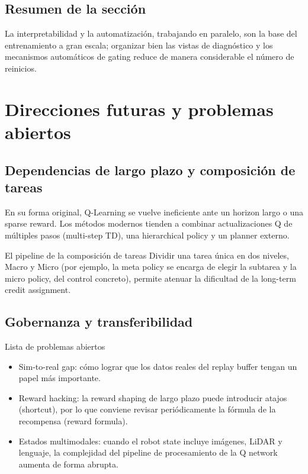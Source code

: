 \documentclass[a4paper]{article}
\begin{document}
\subsection{Resumen de la sección}

La interpretabilidad y la automatización, trabajando en paralelo, son la base del entrenamiento a gran escala; organizar bien las vistas de diagnóstico y los mecanismos automáticos de gating reduce de manera considerable el número de reinicios.
\section{Direcciones futuras y problemas abiertos}

\subsection{Dependencias de largo plazo y composición de tareas}

En su forma original, Q-Learning se vuelve ineficiente ante un horizon largo o una sparse reward. Los métodos modernos tienden a combinar actualizaciones Q de múltiples pasos (multi-step TD), una hierarchical policy y un planner externo.

\begin{importantbox}{El pipeline de la composición de tareas}
Dividir una tarea única en dos niveles, Macro y Micro (por ejemplo, la meta policy se encarga de elegir la subtarea y la micro policy, del control concreto), permite atenuar la dificultad de la long-term credit assignment.
\end{importantbox}

\subsection{Gobernanza y transferibilidad}

\begin{knowledgebox}{Lista de problemas abiertos}
\begin{itemize}
    \item Sim-to-real gap: cómo lograr que los datos reales del replay buffer tengan un papel más importante.
    \item Reward hacking: la reward shaping de largo plazo puede introducir atajos (shortcut), por lo que conviene revisar periódicamente la fórmula de la recompensa (reward formula).
    \item Estados multimodales: cuando el robot state incluye imágenes, LiDAR y lenguaje, la complejidad del pipeline de procesamiento de la Q network aumenta de forma abrupta.
\end{itemize}
\end{knowledgebox}
\end{document}
